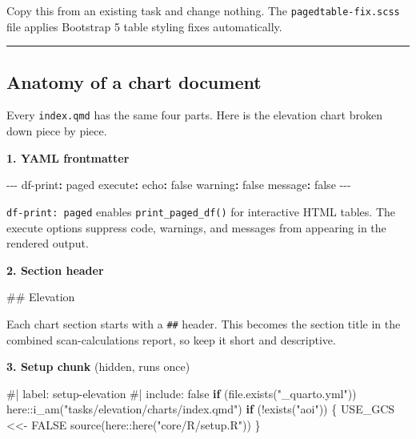 \documentclass[
  letterpaper,
  DIV=11,
  numbers=noendperiod]{scrreprt}
\newenvironment{Shaded}{\begin{snugshade}}{\end{snugshade}}
\newcommand{\AttributeTok}[1]{\textcolor[rgb]{0.40,0.45,0.13}{#1}}
\newcommand{\CharTok}[1]{\textcolor[rgb]{0.13,0.47,0.30}{#1}}
\newcommand{\CommentTok}[1]{\textcolor[rgb]{0.37,0.37,0.37}{#1}}
\newcommand{\ConstantTok}[1]{\textcolor[rgb]{0.56,0.35,0.01}{#1}}
\newcommand{\ControlFlowTok}[1]{\textcolor[rgb]{0.00,0.23,0.31}{\textbf{#1}}}
\newcommand{\FunctionTok}[1]{\textcolor[rgb]{0.28,0.35,0.67}{#1}}
\newcommand{\KeywordTok}[1]{\textcolor[rgb]{0.00,0.23,0.31}{\textbf{#1}}}
\newcommand{\NormalTok}[1]{\textcolor[rgb]{0.00,0.23,0.31}{#1}}
\newcommand{\OtherTok}[1]{\textcolor[rgb]{0.00,0.23,0.31}{#1}}
\newcommand{\PreprocessorTok}[1]{\textcolor[rgb]{0.68,0.00,0.00}{#1}}
\newcommand{\SpecialCharTok}[1]{\textcolor[rgb]{0.37,0.37,0.37}{#1}}
\newcommand{\StringTok}[1]{\textcolor[rgb]{0.13,0.47,0.30}{#1}}
\begin{document}
Copy this from an existing task and change nothing. The
\texttt{pagedtable-fix.scss} file applies Bootstrap 5 table styling
fixes automatically.

\begin{center}\rule{0.5\linewidth}{0.5pt}\end{center}

\subsection{Anatomy of a chart
document}\label{anatomy-of-a-chart-document}

Every \texttt{index.qmd} has the same four parts. Here is the elevation
chart broken down piece by piece.

\textbf{1. YAML frontmatter}

\begin{Shaded}
\begin{Highlighting}[]
\PreprocessorTok{{-}{-}{-}}
\FunctionTok{df{-}print}\KeywordTok{:}\AttributeTok{ paged}
\FunctionTok{execute}\KeywordTok{:}
\AttributeTok{  }\FunctionTok{echo}\KeywordTok{:}\AttributeTok{ }\CharTok{false}
\AttributeTok{  }\FunctionTok{warning}\KeywordTok{:}\AttributeTok{ }\CharTok{false}
\AttributeTok{  }\FunctionTok{message}\KeywordTok{:}\AttributeTok{ }\CharTok{false}
\PreprocessorTok{{-}{-}{-}}
\end{Highlighting}
\end{Shaded}

\texttt{df-print:\ paged} enables \texttt{print\_paged\_df()} for
interactive HTML tables. The execute options suppress code, warnings,
and messages from appearing in the rendered output.

\textbf{2. Section header}

\begin{Shaded}
\begin{Highlighting}[]
\FunctionTok{\#\# Elevation}
\end{Highlighting}
\end{Shaded}

Each chart section starts with a \texttt{\#\#} header. This becomes the
section title in the combined scan-calculations report, so keep it short
and descriptive.

\textbf{3. Setup chunk} (hidden, runs once)

\begin{Shaded}
\begin{Highlighting}[]
\CommentTok{\#| label: setup{-}elevation}
\CommentTok{\#| include: false}
\ControlFlowTok{if}\NormalTok{ (}\FunctionTok{file.exists}\NormalTok{(}\StringTok{"\_quarto.yml"}\NormalTok{)) here}\SpecialCharTok{::}\FunctionTok{i\_am}\NormalTok{(}\StringTok{"tasks/elevation/charts/index.qmd"}\NormalTok{)}
\ControlFlowTok{if}\NormalTok{ (}\SpecialCharTok{!}\FunctionTok{exists}\NormalTok{(}\StringTok{"aoi"}\NormalTok{)) \{}
\NormalTok{  USE\_GCS }\OtherTok{\textless{}\textless{}{-}} \ConstantTok{FALSE}
  \FunctionTok{source}\NormalTok{(here}\SpecialCharTok{::}\FunctionTok{here}\NormalTok{(}\StringTok{"core/R/setup.R"}\NormalTok{))}
\NormalTok{\}}
\end{Highlighting}
\end{Shaded}
\end{document}
